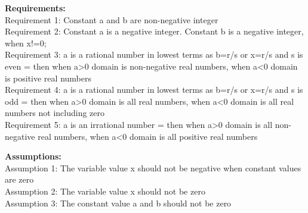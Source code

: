 \documentclass[a4paper,10pt]{article}
\begin{document}
\newpage
{\Large\textbf{Requirements:}\\}
\newline
\indent\indent
{\fontsize{12}{16}\selectfont Requirement 1: Constant a and b are non-negative integer \\}
\newline
\indent\indent
{\fontsize{12}{16}\selectfont Requirement 2: Constant a is a negative integer. Constant b is a negative integer, when x!=0; \\}
\newline
\indent\indent
{\fontsize{12}{16}\selectfont Requirement 3: a is a rational number in lowest terms as b=r/s or x=r/s and s is even = then when a>0 domain is non-negative real numbers, when a<0 domain is positive real numbers\\}
\newline
\indent\indent
{\fontsize{12}{16}\selectfont Requirement 4: a is a rational number in lowest terms as b=r/s or x=r/s and s is odd = then when a>0 domain is all real numbers, when a<0 domain is all real numbers not including zero \\}
\newline
\indent\indent
{\fontsize{12}{16}\selectfont Requirement 5: a is an  irrational number = then when a>0 domain is all non-negative real numbers, when a<0 domain is all positive real numbers \\}

{\Large\textbf{Assumptions:}\\}
\newline
\indent\indent
{\fontsize{12}{16}\selectfont Assumption 1: The variable value x should not be negative when constant values are zero \\}
\newline
\indent\indent
{\fontsize{12}{16}\selectfont Assumption 2: The variable value x should not be zero \\}
\newline
\indent\indent
{\fontsize{12}{16}\selectfont Assumption 3: The constant value a and b should not be zero \\}
\end{document}
